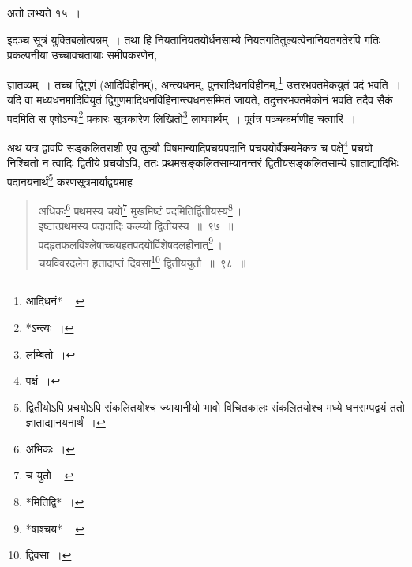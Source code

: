 \documentclass[10pt, openany]{book}
\begin{document}
{{{{{{{{{{{{{{ अतो लभ्यते १५~। 
\vspace{3mm}

 {इदञ्च सूत्रं युक्तिबलोत्पन्नम्~। तथा हि नियतानियतयोर्धनसाम्ये
नियतगतितुल्यत्वेनानियतगतेरपि गतिः प्रकल्पनीया उच्चावचतायाः समीपकरणेन,}

\newpage

{ज्ञातव्यम्~। तच्च द्विगुणं (आदिविहीनम्), अन्त्यधनम्,
पुनरादिधनविहीनम्,\renewcommand{\thefootnote}{१}\footnote{आदिधनं*~।}  उत्तरभक्तमेकयुतं पदं भवति~। यदि वा मध्यधनमादिवियुतं
द्विगुणमादिधनविहिनान्त्यधनसम्मितं}
{जायते, तदुत्तरभक्तमेकोनं भवति तदैव सैकं पदमिति स एषोऽन्यः\renewcommand{\thefootnote}{२}\footnote{*ऽन्त्यः~।} प्रकारः
सूत्रकारेण लिखितो\renewcommand{\thefootnote}{३}\footnote{लम्बितो~।}}
{लाघवार्थम्~। पूर्वत्र पञ्चकर्माणीह चत्वारि~।}
\vspace{3mm}

{अथ यत्र द्वावपि सङ्कलितराशी एव तुल्यौ विषमान्यादिप्रचयपदानि
प्रचययोर्वैषम्यमेकत्र च पक्षे\renewcommand{\thefootnote}{४}\footnote{पक्षं~।} प्रचयो निश्चितो न त्वादिः द्वितीये प्रचयोऽपि, ततः
प्रथमसङ्कलितसाम्यानन्तरं}
{द्वितीयसङ्कलितसाम्ये ज्ञाताद्यादिभिः पदानयनार्थं\renewcommand{\thefootnote}{५}\footnote{द्वितीयोऽपि प्रचयोऽपि 
संकलितयोश्च ज्यायानीयो भावो विचितकालः संकलितयोश्च मध्ये धनसम्पद्वयं ततो
ज्ञाताद्यानयनार्थं~।}
करणसूत्रमार्याद्वयमाह\textendash}

\begin{quote}
    
{\bs अधिकः\renewcommand{\thefootnote}{६}\footnote{अभिकः~।} प्रथमस्य चयो\renewcommand{\thefootnote}{७}\footnote{च युतो~।} मुखमिष्टं पदमितिर्द्वितीयस्य\renewcommand{\thefootnote}{८}\footnote{*मितिद्वि*~।}\,। \\
 इष्टात्प्रथमस्य पदादादिः कल्प्यो द्वितीयस्य~॥~९७~॥ \\
 पदहृतफलविश्लेषाच्चयहतपदयोर्विशेषदलहीनात्\renewcommand{\thefootnote}{९}\footnote{*षाश्चय*~।}\,।\\
 चयविवरदलेन हृतादाप्तं दिवसा\renewcommand{\thefootnote}{१०}\footnote{द्विवसा~।} द्वितीययुतौ~॥~९८~॥}\end{quote}

}}}}}}}}}}}}}}
\end{document}
